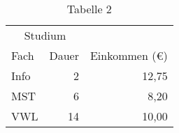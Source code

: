 \begin{table}[htbp]
     \centering
	 \caption{Tabelle 2}
	 \label{tab:tabelleTwo}  
     \begin{tabular}{lrr} 
     \toprule
     \multicolumn{2}{c}{Studium}\\ \cmidrule[3pt]{1-2}
     Fach & Dauer & Einkommen (\euro{})\\ 
     \midrule 
     Info & 2 & 12,75 \\ \addlinespace
     MST & 6 & 8,20 \\ \addlinespace
     VWL & 14 & 10,00\\ 
     \bottomrule
     \end{tabular}
\end{table}